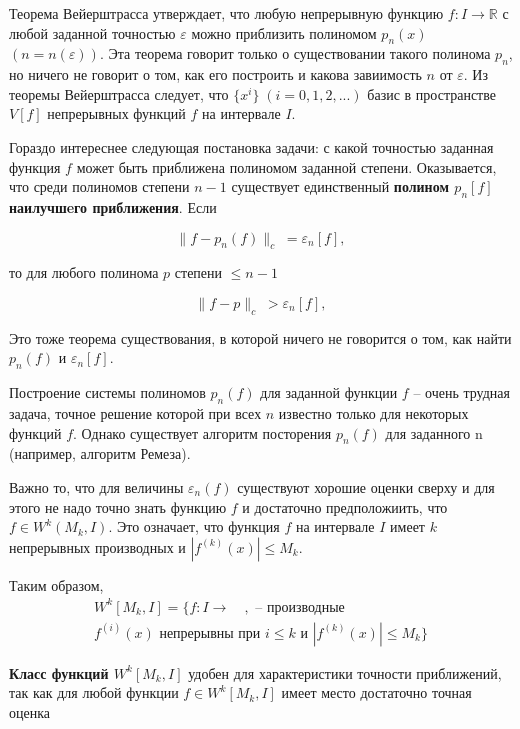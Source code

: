 Теорема Вейерштрасса утверждает, что любую непрерывную функцию $f: I \rightarrow \mathbb{R}$  с любой заданной точностью $\varepsilon$ можно приблизить полиномом $p_n(x)$ $(n = n(\varepsilon))$. 
Эта теорема говорит только о существовании такого полинома $p_n$, но ничего не говорит о том, как его построить и какова завиимость $n$ от $\varepsilon$. 
Из теоремы Вейерштрасса следует, что $\{x^i\} \; (i = 0, 1, 2, ...)$ базис в пространстве $V[f]$ непрерывных функций $f$ на интервале $I$.

Гораздо интереснее следующая постановка задачи: с какой точностью заданная функция $f$ может быть приближена полиномом заданной степени. 
Оказывается, что среди полиномов степени $n - 1$ существует единственный \textbf{полином $p_n[f]$ наилучшeго приближения}. Если

\begin{equation}\label{eq:best_polynom}
\parallel f - p_n(f) \parallel_c \; = \varepsilon_n[f],
\end{equation}

то для любого полинома $p$ степени $\leq n - 1$

\begin{equation}
\parallel f - p \parallel_c \; > \varepsilon_n[f],
\end{equation}

Это тоже теорема существования, в которой ничего не говорится о том, как найти $p_n(f)$ и  $\varepsilon_n[f]$.

Построение системы полиномов $p_n(f)$ для заданной функции $f$ -- очень трудная задача, точное решение которой при всех $n$ известно только для некоторых функций $f$. 
Однако существует алгоритм посторения $p_n(f)$ для заданного n (например, алгоритм Ремеза).

Важно то, что для величины $\varepsilon_n(f)$ существуют хорошие оценки сверху и для этого не надо точно знать функцию $f$ и достаточно предположиить, что $f \in W^k(M_k, I)$. Это означает, что функция $f$ на интервале $I$ имеет $k$ непрерывных производных и $|f^{(k)}(x)|\leq M_k$. 

Таким образом,
\begin{eqnarray}
W^k[M_k, I] = \{f: I \rightarrow \quad , \text{ -- производные} \nonumber \\
f^{(i)}(x) \text{ непрерывны при $i \leq k$ и } |f^{(k)}(x)| \leq M_k \}
\end{eqnarray}


\textbf{Класс функций $W^k[M_k, I]$} удобен для характеристики точности приближений, так как для любой функции $f \in W^k[M_k, I]$ имеет место достаточно точная оценка

